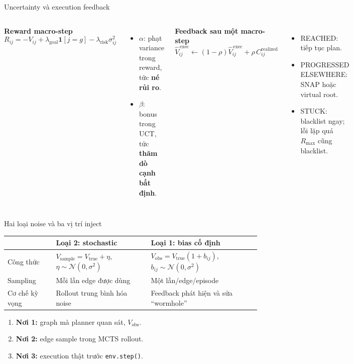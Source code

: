 \documentclass[aspectratio=169,10pt]{beamer}
\newcommand{\code}[1]{\texttt{\small #1}}
\begin{document}
\begin{frame}{Uncertainty và execution feedback}
  \begin{columns}[T]
      \textbf{Reward macro-step}
      \[
        R_{ij}=-V_{ij}
        +\lambda_{\mathrm{goal}}\mathbf{1}[j=g]
        -\lambda_{\mathrm{risk}}\sigma_{ij}^{2}
      \]
      \begin{itemize}
        \item $\alpha$: phạt variance trong reward, tức \textbf{né rủi ro}.
        \item $\beta$: bonus trong UCT, tức \textbf{thăm dò cạnh bất định}.
      \end{itemize}
      \textbf{Feedback sau một macro-step}
      \[
        \widehat V^{\,\mathrm{exec}}_{ij}\leftarrow
        (1-\rho)\widehat V^{\,\mathrm{exec}}_{ij}
        +\rho\,C^{\mathrm{realized}}_{ij}
      \]
      \begin{itemize}
        \item REACHED: tiếp tục plan.
        \item PROGRESSED ELSEWHERE: SNAP hoặc virtual root.
        \item STUCK: blacklist ngay; lỗi lặp quá $R_{\max}$ cũng blacklist.
      \end{itemize}
  \end{columns}
\end{frame}

\begin{frame}{Hai loại noise và ba vị trí inject}
  \small
  \begin{tabularx}{\textwidth}{@{}lXX@{}}
    \toprule
      & \textbf{Loại 2: stochastic} & \textbf{Loại 1: bias cố định} \\
    \midrule
    Công thức
      & $V_{\mathrm{sample}}=V_{\mathrm{true}}+\eta$,
        $\eta\sim\mathcal N(0,\sigma^2)$
      & $V_{\mathrm{obs}}=V_{\mathrm{true}}(1+b_{ij})$,
        $b_{ij}\sim\mathcal N(0,\sigma^2)$ \\
    Sampling
      & Mỗi lần edge được dùng
      & Một lần/edge/episode \\
    Cơ chế kỳ vọng
      & Rollout trung bình hóa noise
      & Feedback phát hiện và sửa ``wormhole'' \\
    \bottomrule
  \end{tabularx}

  \vspace{0.9em}
  \begin{enumerate}
    \item \textbf{Nơi 1:} graph mà planner quan sát, $V_{\mathrm{obs}}$.
    \item \textbf{Nơi 2:} edge sample trong MCTS rollout.
    \item \textbf{Nơi 3:} execution thật trước \code{env.step()}.
  \end{enumerate}
\end{frame}
\end{document}
